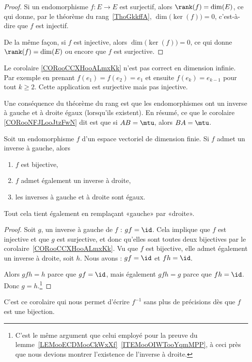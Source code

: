 \begin{proof}
	Si un endomorphisme \( f\colon E\to E\) est surjectif, alors \( \rank(f)=\dim(E)\), ce qui donne, par le théorème du rang~\ref{ThoGkkffA}, \( \dim\big( \ker(f) \big)=0\), c'est-à-dire que \( f\) est injectif.

	De la même façon, si \( f\) est injective, alors \( \dim\big( \ker(f) \big)=0\), ce qui donne \( \rank(f)=\dim(E)\) ou encore que \( f\) est surjective.
\end{proof}

\begin{example}
	Le corolaire \ref{CORooCCXHooALmxKk} n'est pas correct en dimension infinie. Par exemple en prenant \( f(e_1)=f(e_2)=e_1\) et ensuite \( f(e_k)=e_{k-1}\) pour tout \( k\geq 2\). Cette application est surjective mais pas injective.
\end{example}

Une conséquence du théorème du rang est que les endomorphismes ont un inverse à gauche et à droite égaux (lorsqu'ils existent). En résumé, ce que le corolaire \ref{CORooNFJLooJtzFwN} dit est que si \( AB=\mtu\), alors \( BA=\mtu\).
\begin{corollary}           \label{CORooNFJLooJtzFwN}
	Soit un endomorphisme \( f\) d'un espace vectoriel de dimension finie. Si \( f\) admet un inverse à gauche, alors
	\begin{enumerate}
		\item
		      \( f\) est bijective,
		\item
		      \( f\) admet également un inverse à droite,
		\item
		      les inverses à gauche et à droite sont égaux.
	\end{enumerate}
	Tout cela tient également en remplaçant «gauche» par «droite».
\end{corollary}

\begin{proof}
	Soit \( g\), un inverse à gauche de \( f\) : \( gf=\id\). Cela implique que \( f\) est injective et que \( g\) est surjective, et donc qu'elles sont toutes deux bijectives par le corolaire~\ref{CORooCCXHooALmxKk}. Vu que \( f\) est bijective, elle admet également un inverse à droite, soit \( h\). Nous avons : \( gf=\id\) et \( fh=\id\).

	Alors \( gfh=h\) parce que \( gf=\id\), mais également \( gfh=g\) parce que \( fh=\id\). Donc \( g=h\).\footnote{C'est le même argument que celui employé pour la preuve du lemme~\ref{LEMooECDMooCkWxXf}~\ref{ITEMooOIWTooYqmMPP}, à ceci près que nous devions montrer l'existence de l'inverse à droite.}
\end{proof}
C'est ce corolaire qui nous permet d'écrire \( f^{-1}\) sans plus de précisions dès que \( f\) est une bijection.

